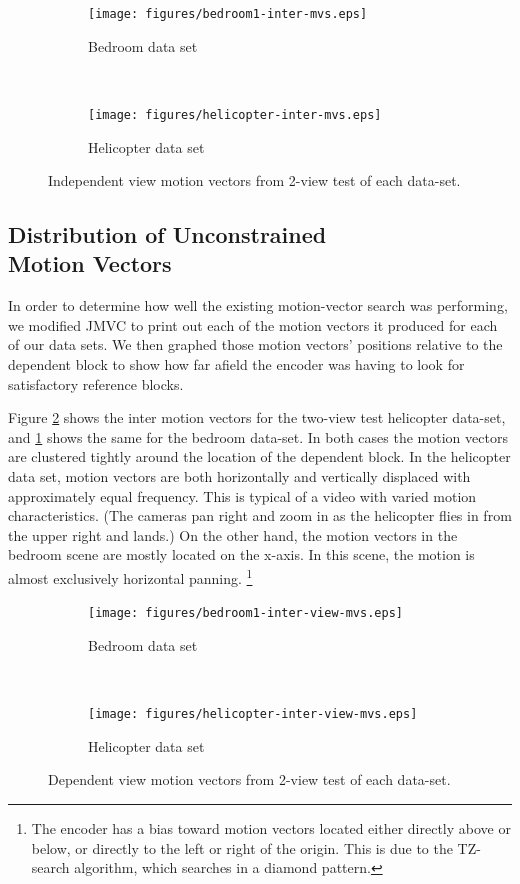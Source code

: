 \documentclass{sig-alternate-05-2015}
\begin{document}
\begin{figure}[H]
\centering
\begin{subfigure}{.5\textwidth}
\centering
\texttt{[image: figures/bedroom1-inter-mvs.eps]}
\caption{Bedroom data set}
\label{fig:bedroom-inter-mvs}
\end{subfigure} \\
\begin{subfigure}{.5\textwidth}
\centering
\texttt{[image: figures/helicopter-inter-mvs.eps]}
\caption{Helicopter data set}
\label{fig:helicopter-inter-mvs}
\end{subfigure}
\caption{Independent view motion vectors from 2-view test of each data-set.}
\label{fig:inter-mvs}
\end{figure}

\subsection{Distribution of Unconstrained \\ Motion Vectors}
\label{subsec:unconstrained}
In order to determine how well the existing motion-vector search was performing,
we modified JMVC to print out each of the motion vectors it produced for each of
our data sets. We then graphed those motion vectors' positions relative to the
dependent block to show how far afield the encoder was having to look for
satisfactory reference blocks.

Figure \ref{fig:helicopter-inter-mvs} shows the inter motion vectors for the
two-view test helicopter data-set, and \ref{fig:bedroom-inter-mvs} shows the
same for the bedroom data-set. In both cases the motion vectors are clustered
tightly around the location of the dependent block. In the helicopter data set,
motion vectors are both horizontally and vertically displaced with approximately
equal frequency. This is typical of a video with varied motion characteristics.
(The cameras pan right and zoom in as the helicopter flies in from the upper
right and lands.) On the other hand, the motion vectors in the bedroom scene are
mostly located on the x-axis. In this scene, the motion is almost exclusively
horizontal panning. \footnote{The encoder has a bias toward motion vectors
located either directly above or below, or directly to the left or right of the
origin. This is due to the TZ-search algorithm, which searches in a diamond
pattern.}

\begin{figure}[H]
\centering
\begin{subfigure}{.5\textwidth}
\centering
\texttt{[image: figures/bedroom1-inter-view-mvs.eps]}
\caption{Bedroom data set}
\label{fig:bedroom-inter-view-mvs}
\end{subfigure} \\
\begin{subfigure}{.5\textwidth}
\centering
\texttt{[image: figures/helicopter-inter-view-mvs.eps]}
\caption{Helicopter data set}
\label{fig:helicopter-inter-view-mvs}
\end{subfigure}
\caption{Dependent view motion vectors from 2-view test of each data-set.}
\label{fig:inter-view-mvs}
\end{figure}
\end{document}
